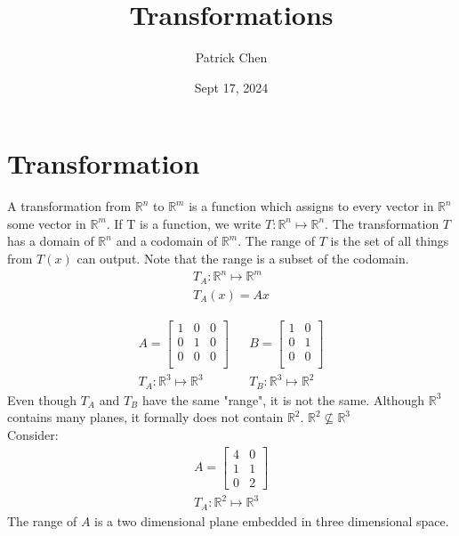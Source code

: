 \documentclass{article}
\title{Transformations}
\author{Patrick Chen}
\date{Sept 17, 2024}
\theoremstyle{mytheoremstyle}
\theoremstyle{mytheoremstyle}
\theoremstyle{myproblemstyle}
\begin{document}
    \maketitle
    \section*{Transformation}
    A transformation from $\mathbb{R}^n$ to $\mathbb{R}^m$ is a function which
    assigns to every vector in $\mathbb{R}^n$ some vector in $\mathbb{R}^m$. If
    T is a function, we write $T: \mathbb{R}^n \mapsto \mathbb{R}^n$. The
    transformation $T$ has a domain of $\mathbb{R}^n$ and a codomain of
    $\mathbb{R}^m$. The range of $T$ is the set of all things from $T(x)$ can
    output. Note that the range is a subset of the codomain.
    \begin{align*}
        T_A: \mathbb{R}^n \mapsto \mathbb{R}^m \\
        T_A(x) = Ax
    \end{align*}

    \begin{align*}
        A = \begin{bmatrix}
            1 & 0 & 0 \\
            0 & 1 & 0 \\
            0 & 0 & 0 \\
        \end{bmatrix} &&
        B = \begin{bmatrix}
            1 & 0 \\
            0 & 1 \\
            0 & 0 \\
        \end{bmatrix} \\
        T_A: \mathbb{R}^3 \mapsto \mathbb{R}^3 &&
        T_B: \mathbb{R}^3 \mapsto \mathbb{R}^2
    \end{align*}
    Even though $T_A$ and $T_B$ have the same "range", it is not the same.
    Although $\mathbb{R}^3$ contains many planes, it formally does not contain
    $\mathbb{R}^2$. $\mathbb{R}^2 \nsubseteq \mathbb{R}^3$ \\
    Consider:
    \begin{align*}
        A = \begin{bmatrix}
            4 & 0 \\
            1 & 1 \\
            0 & 2
        \end{bmatrix} \\
        T_A: \mathbb{R}^2 \mapsto \mathbb{R}^3
    \end{align*}
    The range of $A$ is a two dimensional plane embedded in three dimensional
    space.
\end{document}
